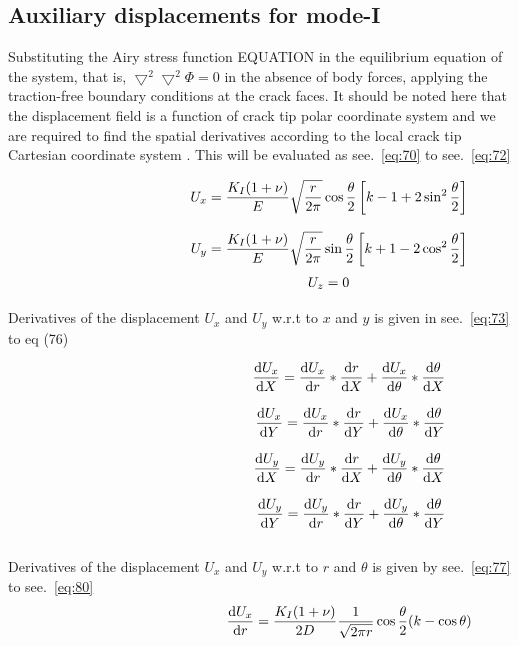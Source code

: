 \documentclass[fleqn, 12.5pt,a4paper]{report}
\begin{document}
\subsection{{Auxiliary displacements for mode-I}}
Substituting the Airy stress function EQUATION in the equilibrium equation of the system, that is, $\bigtriangledown^2 \bigtriangledown^2\Phi = 0$ \cite{khoei2014extended}
in the absence of body forces, applying the traction-free boundary conditions at the crack faces. It should be noted here that the displacement field is a function of crack tip polar coordinate system and we are required to find the spatial derivatives according to the local crack tip Cartesian coordinate system \cite{nagashima2003stress}. This will be evaluated as see.~\autoref{eq:70} to see.~\autoref{eq:72}

\begin{align}\label{eq:70}
\hspace{3.5cm}U_x = \frac{K_I (1+\nu)}{E} \sqrt{\frac{r}{2\pi}} \cos\frac{\theta}{2} \left[k-1+2\sin^2\frac{\theta}{2} \right]\\[8pt]
U_y = \frac{K_I (1+\nu)}{E} \sqrt{\frac{r}{2\pi}} \sin\frac{\theta}{2} \left[k+1-2\cos^2\frac{\theta}{2} \right]
\end{align}
\vspace{-1.5cm}
\begin{align}\label{eq:72}
\hspace{3.5cm}U_z = 0
\end{align}

Derivatives of the displacement $U_x$ and $U_y$ w.r.t to $x$ and $y$ \cite{nagashima2003stress} is given in see.~\autoref{eq:73} to eq (76)

\begin{align}\label{eq:73}
\hspace{4.5cm}\dv{U_x}{X} = \dv{U_x}{r}*\dv{r}{X} + \dv{U_x}{\theta}*\dv{\theta}{X}\\[8pt]
\dv{U_x}{Y} = \dv{U_x}{r}*\dv{r}{Y} + \dv{U_x}{\theta}*\dv{\theta}{Y} \\[8pt]
\dv{U_y}{X} = \dv{U_y}{r}*\dv{r}{X} + \dv{U_y}{\theta}*\dv{\theta}{X} \\[8pt]
\dv{U_y}{Y} = \dv{U_y}{r}*\dv{r}{Y} + \dv{U_y}{\theta}*\dv{\theta}{Y}
\end{align}
\\
Derivatives of the displacement $U_x$ and $U_y$ w.r.t to $r$ and $\theta$ \cite{nagashima2003stress}is given by see.~\autoref{eq:77} to see.~\autoref{eq:80} 
\begin{align}\label{eq:77}
\hspace{4.5cm}\dv{U_x}{r} = \frac{K_I(1+\nu)}{2D} \frac{1}{\sqrt{2\pi r}} \cos\frac{\theta}{2} (k-\cos\theta)
\end{align}
\end{document}
